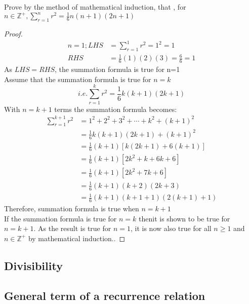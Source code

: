 \documentclass[a4paper]{article}
\begin{document}
\begin{eg}
	Prove by the method of mathematical induction, that , for $n\in\mathbb{Z}^+ , \sum_{r=1}^nr^2=\frac{1}{6}n(n+1)(2n+1)$
	\begin{proof}
		\begin{align*}
			n=1; LHS & =\sum_{r=1}^1r^2=1^2=1              \\
			RHS      & =\frac{1}{6}(1)(2)(3)=\frac{6}{6}=1
		\end{align*}
		As $LHS=RHS$, the summation formula is true for n=1\\

		Assume that the summation formula is true for $n=k$
		\begin{equation*}
			i.e.\sum_{r=1}^kr^2=\frac{1}{6}k(k+1)(2k+1)
		\end{equation*}
		With $n=k+1$ terms the summation formula becomes:
		\begin{align*}
			\sum_{r=1}^{k+1}r^2 & =1^2+2^2+3^2+\cdots+k^2+(k+1)^2    \\
			                    & =\frac{1}{6}k(k+1)(2k+1)+(k+1)^2   \\
			                    & =\frac{1}{6}(k+1)[k(2k+1)+6(k+1)]  \\
			                    & =\frac{1}{6}(k+1)[2k^2+k+6k+6]     \\
			                    & =\frac{1}{6}(k+1)[2k^2+7k+6]       \\
			                    & =\frac{1}{6}(k+1)(k+2)(2k+3)       \\
			                    & =\frac{1}{6}(k+1)(k+1+1)(2(k+1)+1)
		\end{align*}
		Therefore, summation formula is true when $n=k+1$\\
		If the summation formula is true for $n=k$ thenit is shown to be true for $n=k+1$. As the result is true for $n=1$, it is now also true for all $n\geq1$ and $n\in\mathbb{Z}^+$ by mathematical induction..
	\end{proof}
\end{eg}

\subsection{Divisibility}

\subsection{General term of a recurrence relation}
\end{document}
